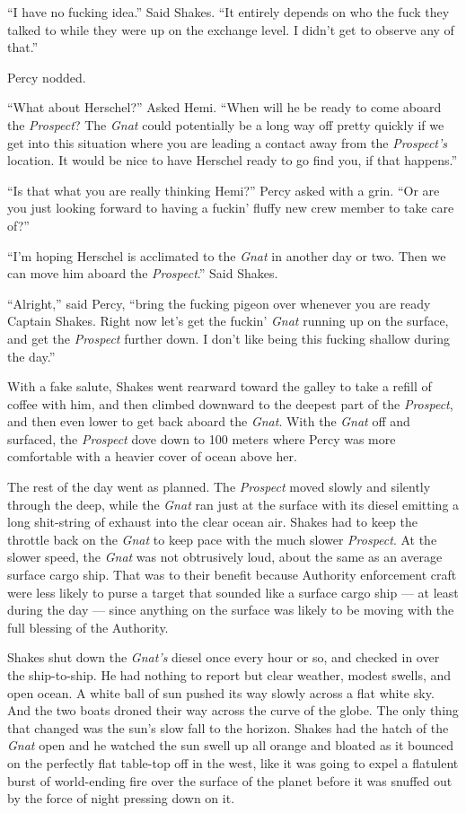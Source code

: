 \documentclass[
]{scrbook}
\begin{document}
``I have no fucking idea.'' Said Shakes. ``It entirely depends on who
the fuck they talked to while they were up on the exchange level. I
didn't get to observe any of that.''

Percy nodded.

``What about Herschel?'' Asked Hemi. ``When will he be ready to come
aboard the \emph{Prospect}? The \emph{Gnat} could potentially be a long
way off pretty quickly if we get into this situation where you are
leading a contact away from the \emph{Prospect's} location. It would be
nice to have Herschel ready to go find you, if that happens.''

``Is that what you are really thinking Hemi?'' Percy asked with a grin.
``Or are you just looking forward to having a fuckin' fluffy new crew
member to take care of?''

``I'm hoping Herschel is acclimated to the \emph{Gnat} in another day or
two. Then we can move him aboard the \emph{Prospect}.'' Said Shakes.

``Alright,'' said Percy, ``bring the fucking pigeon over whenever you
are ready Captain Shakes. Right now let's get the fuckin' \emph{Gnat}
running up on the surface, and get the \emph{Prospect} further down. I
don't like being this fucking shallow during the day.''

With a fake salute, Shakes went rearward toward the galley to take a
refill of coffee with him, and then climbed downward to the deepest part
of the \emph{Prospect}, and then even lower to get back aboard the
\emph{Gnat}. With the \emph{Gnat} off and surfaced, the \emph{Prospect}
dove down to 100 meters where Percy was more comfortable with a heavier
cover of ocean above her.

The rest of the day went as planned. The \emph{Prospect} moved slowly
and silently through the deep, while the \emph{Gnat} ran just at the
surface with its diesel emitting a long shit-string of exhaust into the
clear ocean air. Shakes had to keep the throttle back on the \emph{Gnat}
to keep pace with the much slower \emph{Prospect}. At the slower speed,
the \emph{Gnat} was not obtrusively loud, about the same as an average
surface cargo ship. That was to their benefit because Authority
enforcement craft were less likely to purse a target that sounded like a
surface cargo ship --- at least during the day --- since anything on the
surface was likely to be moving with the full blessing of the Authority.

Shakes shut down the \emph{Gnat's} diesel once every hour or so, and
checked in over the ship-to-ship. He had nothing to report but clear
weather, modest swells, and open ocean. A white ball of sun pushed its
way slowly across a flat white sky. And the two boats droned their way
across the curve of the globe. The only thing that changed was the sun's
slow fall to the horizon. Shakes had the hatch of the \emph{Gnat} open
and he watched the sun swell up all orange and bloated as it bounced on
the perfectly flat table-top off in the west, like it was going to expel
a flatulent burst of world-ending fire over the surface of the planet
before it was snuffed out by the force of night pressing down on it.
\end{document}
